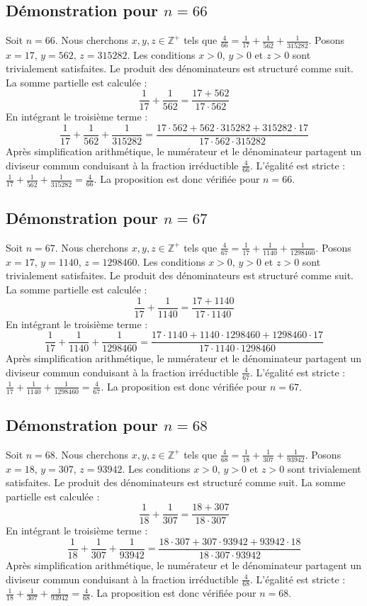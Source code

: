 \documentclass[11pt,a4paper]{article}
\begin{document}
\subsection{Démonstration pour $n = 66$}
Soit $n = 66$. Nous cherchons $x, y, z \in \mathbb{Z}^{+}$ tels que $\frac{4}{66} = \frac{1}{17} + \frac{1}{562} + \frac{1}{315282}$.
Posons $x = 17$, $y = 562$, $z = 315282$.
Les conditions $x > 0$, $y > 0$ et $z > 0$ sont trivialement satisfaites.
Le produit des dénominateurs est structuré comme suit. La somme partielle est calculée :
$$ \frac{1}{17} + \frac{1}{562} = \frac{17+562}{17 \cdot 562} $$
En intégrant le troisième terme :
$$ \frac{1}{17} + \frac{1}{562} + \frac{1}{315282} = \frac{17 \cdot 562 + 562 \cdot 315282 + 315282 \cdot 17}{17 \cdot 562 \cdot 315282} $$
Après simplification arithmétique, le numérateur et le dénominateur partagent un diviseur commun conduisant à la fraction irréductible $\frac{4}{66}$.
L'égalité est stricte : $\frac{1}{17} + \frac{1}{562} + \frac{1}{315282} = \frac{4}{66}$.
La proposition est donc vérifiée pour $n = 66$.
\subsection{Démonstration pour $n = 67$}
Soit $n = 67$. Nous cherchons $x, y, z \in \mathbb{Z}^{+}$ tels que $\frac{4}{67} = \frac{1}{17} + \frac{1}{1140} + \frac{1}{1298460}$.
Posons $x = 17$, $y = 1140$, $z = 1298460$.
Les conditions $x > 0$, $y > 0$ et $z > 0$ sont trivialement satisfaites.
Le produit des dénominateurs est structuré comme suit. La somme partielle est calculée :
$$ \frac{1}{17} + \frac{1}{1140} = \frac{17+1140}{17 \cdot 1140} $$
En intégrant le troisième terme :
$$ \frac{1}{17} + \frac{1}{1140} + \frac{1}{1298460} = \frac{17 \cdot 1140 + 1140 \cdot 1298460 + 1298460 \cdot 17}{17 \cdot 1140 \cdot 1298460} $$
Après simplification arithmétique, le numérateur et le dénominateur partagent un diviseur commun conduisant à la fraction irréductible $\frac{4}{67}$.
L'égalité est stricte : $\frac{1}{17} + \frac{1}{1140} + \frac{1}{1298460} = \frac{4}{67}$.
La proposition est donc vérifiée pour $n = 67$.
\subsection{Démonstration pour $n = 68$}
Soit $n = 68$. Nous cherchons $x, y, z \in \mathbb{Z}^{+}$ tels que $\frac{4}{68} = \frac{1}{18} + \frac{1}{307} + \frac{1}{93942}$.
Posons $x = 18$, $y = 307$, $z = 93942$.
Les conditions $x > 0$, $y > 0$ et $z > 0$ sont trivialement satisfaites.
Le produit des dénominateurs est structuré comme suit. La somme partielle est calculée :
$$ \frac{1}{18} + \frac{1}{307} = \frac{18+307}{18 \cdot 307} $$
En intégrant le troisième terme :
$$ \frac{1}{18} + \frac{1}{307} + \frac{1}{93942} = \frac{18 \cdot 307 + 307 \cdot 93942 + 93942 \cdot 18}{18 \cdot 307 \cdot 93942} $$
Après simplification arithmétique, le numérateur et le dénominateur partagent un diviseur commun conduisant à la fraction irréductible $\frac{4}{68}$.
L'égalité est stricte : $\frac{1}{18} + \frac{1}{307} + \frac{1}{93942} = \frac{4}{68}$.
La proposition est donc vérifiée pour $n = 68$.
\end{document}
